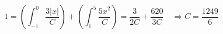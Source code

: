 \documentclass{article} %
\begin{document}
\[
1 = (\int_{-1}^0 \frac{3|x|}{C}) + (\int_{1}^5 \frac{5 x^2}{C}) =  \frac{3}{2C} +\frac{620}{3C}  \quad \Rightarrow C = \frac{1249}{6}
\]
\end{document}
